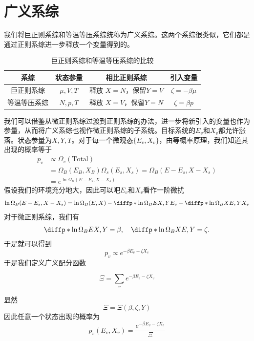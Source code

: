 \section{广义系综} %
\label{sec:广义系综}
我们将巨正则系综和等温等压系综统称为广义系综。这两个系综很类似，它们都是通过正则系综进一步释放一个变量得到的。

\begin{table}[h]
       \centering
       \setlength{\tabcolsep}{6mm}
       \begin{tabular}{c|ccc}
              \hline\hline
              系综& 状态参量 & 相比正则系综 & 引入变量\\
              \hline 
              巨正则系综& $\mu , V, T$ &释放 $X=N$，保留$Y=V$ &$\zeta =-\beta \mu $\\
              等温等压系综 & $N , p, T$ &释放 $X=V$，保留$Y=N$ &$\zeta =\beta p $\\
              \hline\hline 
       \end{tabular}
       \caption{巨正则系综和等温等压系综的比较}
\end{table}

我们可以借鉴从微正则系综过渡到正则系综的办法，进一步将新引入的变量也作为参量，从而将广义系综也视作微正则系综的子系统。目标系统的$E_v$和$X_v$都允许涨落。状态参量为$X,Y,T$。对于每一个微观态$\{E_v,X_v\}$，由等概率原理，我们知道其出现的概率等于\begin{equation}
       \begin{aligned}
              p_v &\propto \Omega_v(\text{Total})\\
              &=\Omega_B(E_B,X_B)\Omega_s(E_s,X_s)=\Omega_B(E-E_s,X-X_s)\\
              &=e^{\ln \Omega_B (E-E_s,X-X_s)}
       \end{aligned}
\end{equation}
假设我们的环境充分地大，因此可以吧$E_v$和$X_v$看作一阶微扰\begin{equation}
       \ln \Omega_B (E-E_s,X-X_s)=\ln \Omega_B (E,X)-\diffp*{{\ln \Omega_B}}{E}{X,Y}E_v-\diffp*{{\ln \Omega_B}}{X}{E,Y}X_v
\end{equation}
对于微正则系综，我们有\begin{equation}
       \diffp*{{\ln \Omega_B}}{E}{X,Y}=\beta,\quad \diffp*{{\ln \Omega_B}}{X}{E,Y}=\zeta.
\end{equation}
于是就可以得到\begin{equation}
       p_v\propto e^{-\beta E_v-\zeta X_v}
\end{equation}
于是我们定义广义配分函数\begin{definition}[广义配分函数]
\begin{equation}
       \Xi =\sum_v e^{-\beta E_v-\zeta X_v} 
\end{equation}
\end{definition}
显然\begin{equation}
       \Xi =\Xi (\beta,\zeta,Y)
\end{equation}
因此任意一个状态出现的概率为\begin{equation}
       p_v(E_v,X_v)=\frac{e^{-\beta E_v-\zeta X_v}}{\Xi}
\end{equation}

